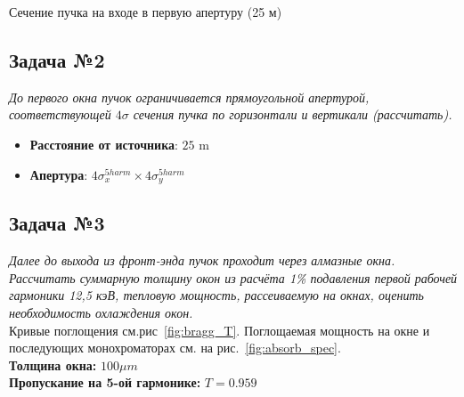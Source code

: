 \documentclass[14pt,a4paper]{extarticle}
\numberwithin{equation}{section}
\begin{document}
	\begin{table}[h!]
		\renewcommand*\dtlrealalign{S}
		\caption{Сечение пучка на входе в первую апертуру (25 м)}
		\centering
		\label{table:size_obeam}
	\end{table}
	
	\subsection{Задача №2}
	\textit{До первого окна пучок ограничивается прямоугольной апертурой, соответствующей $4\sigma$ сечения пучка по горизонтали и вертикали (рассчитать).}
	\begin{itemize}
		\item 	\textbf{Расстояние от источника}: $25$ m 
		\item 	\textbf{Апертура}: $4\sigma^{5 harm}_{x} \times 4\sigma^{5 harm}_{y}$
	\end{itemize}
	
	
	\subsection{Задача №3}
	\textit{Далее до выхода из фронт-энда пучок проходит через алмазные окна. Рассчитать суммарную толщину окон из расчёта 1\% подавления первой рабочей гармоники 12,5 кэВ, тепловую мощность, рассеиваемую на окнах, оценить необходимость охлаждения окон.}\\
	Кривые поглощения см.рис~\ref{fig:bragg_T}. Поглощаемая мощность на окне и последующих монохроматорах см. на рис.~\ref{fig:absorb_spec}.\\
	\textbf{Толщина окна:} $100\mu m$\\
	\textbf{Пропускание на 5-ой гармонике:} $T = 0.959$\\	
	
\end{document}
